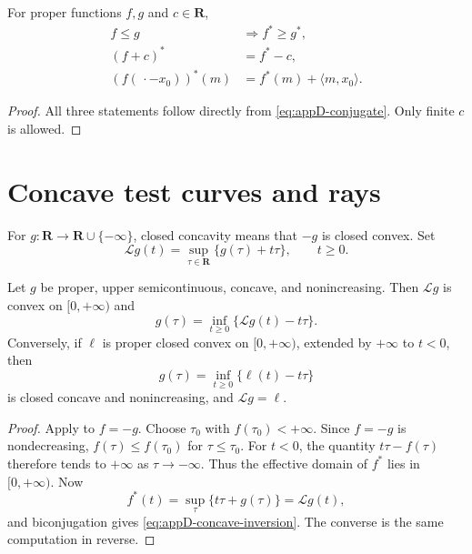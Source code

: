 \begin{proposition}\label{prop:appD-legendre-tests}
For proper functions \(f,g\) and \(c\in\mathbf R\),
\[
\begin{aligned}
 f\leq g&\Longrightarrow f^*\geq g^*,\\
 (f+c)^*&=f^*-c,\\
 (f(\,\cdot-x_0))^*(m)&=f^*(m)+\langle m,x_0\rangle.
\end{aligned}
\tag{D.8}\label{eq:appD-legendre-tests}
\]
\end{proposition}

\begin{proof}
All three statements follow directly from
\eqref{eq:appD-conjugate}.
Only finite \(c\) is allowed.
\end{proof}

\section{Concave test curves and rays}
\label{sec:appD-test-curves}

For \(g:\mathbf R\to\mathbf R\cup\{-\infty\}\), closed concavity means that
\(-g\) is closed convex.
Set
\[
 \mathcal Lg(t)=\sup_{\tau\in\mathbf R}\{g(\tau)+t\tau\},
 \qquad t\geq0.
\tag{D.9}\label{eq:appD-concave-transform}
\]

\begin{theorem}\label{thm:appD-concave-duality}
Let \(g\) be proper, upper semicontinuous, concave, and nonincreasing.
Then \(\mathcal Lg\) is convex on \([0,+\infty)\) and
\[
                  g(\tau)=\inf_{t\geq0}
                    \{\mathcal Lg(t)-t\tau\}.
\tag{D.10}\label{eq:appD-concave-inversion}
\]
Conversely, if \(\ell\) is proper closed convex on \([0,+\infty)\), extended by
\(+\infty\) to \(t<0\), then
\[
 g(\tau)=\inf_{t\geq0}\{\ell(t)-t\tau\}
\]
is closed concave and nonincreasing, and \(\mathcal Lg=\ell\).
\end{theorem}

\begin{proof}
Apply  to \(f=-g\).
Choose \(\tau_0\) with \(f(\tau_0)<+\infty\).  Since \(f=-g\) is
nondecreasing, \(f(\tau)\leq f(\tau_0)\) for \(\tau\leq\tau_0\).
For \(t<0\), the quantity \(t\tau-f(\tau)\) therefore tends to
\(+\infty\) as \(\tau\to-\infty\).  Thus the effective domain of
\(f^*\) lies in \([0,+\infty)\).
Now
\[
 f^*(t)=\sup_\tau\{t\tau+g(\tau)\}=\mathcal Lg(t),
\]
and biconjugation gives \eqref{eq:appD-concave-inversion}.
The converse is the same computation in reverse.
\end{proof}


